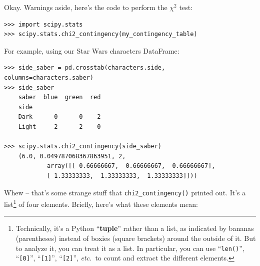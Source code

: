 \label{chisq}


\bigskip
\medskip
Okay. Warnings aside, here's the code to perform the $\chi ^2$ test:

\begin{Verbatim}[fontsize=\small,samepage=true,frame=single]
>>> import scipy.stats
>>> scipy.stats.chi2_contingency(my_contingency_table)
\end{Verbatim}

\begin{samepage}
For example, using our Star Wars characters DataFrame:

\begin{Verbatim}[fontsize=\small,samepage=true,frame=single]
>>> side_saber = pd.crosstab(characters.side, columns=characters.saber)
>>> side_saber
    saber  blue  green  red
    side                   
    Dark      0      0    2
    Light     2      2    0

>>> scipy.stats.chi2_contingency(side_saber)
    (6.0, 0.049787068367863951, 2, 
            array([[ 0.66666667,  0.66666667,  0.66666667],
            [ 1.33333333,  1.33333333,  1.33333333]]))
\end{Verbatim}
\end{samepage}

Whew -- that's some strange stuff that \texttt{chi2\_contingency()} printed
out. It's a list\footnote{Technically, it's a Python ``\textbf{tuple}'' rather
than a list, as indicated by bananas (parentheses) instead of boxies (square
brackets) around the outside of it. But to analyze it, you can treat it as a
list. In particular, you can use ``\texttt{len()}'', ``\texttt{[0]}'',
``\texttt{[1]}'', ``\texttt{[2]}'',
\textit{etc.}~to count and extract the different elements.} of four elements.
Briefly, here's what these elements mean:

